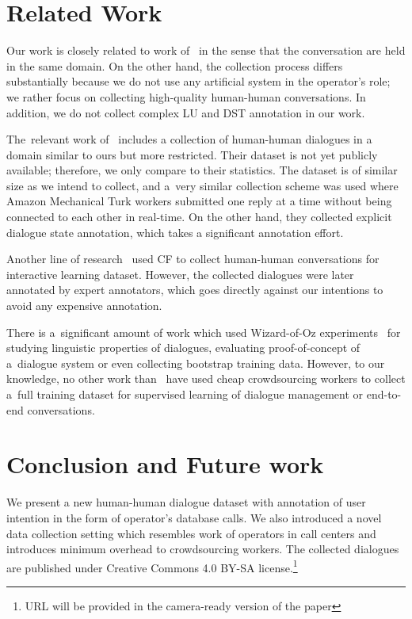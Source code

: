 \documentclass[runningheads,a4paper]{llncs}
\begin{document}
\section{Related Work} \label{sec:related}
\vspace{-0.50em}
Our work is closely related  to work of~\cite{williams2013dstc1,henderson2014dstc2,henderson2014dstc3} in the sense that the conversation are held in the same domain.
On the other hand, the collection process differs substantially because we do not use any artificial system in the operator's role;
we rather focus on collecting high-quality human-human conversations. 
In addition, we do not collect complex LU and DST annotation in our work.

The~relevant work of~\cite{wen2016network} includes a collection of human-human dialogues in a domain similar to ours but more restricted.
Their dataset is not yet publicly available; therefore, we only compare to their statistics.
The dataset is of similar size as we intend to collect, and a~very similar collection scheme was used where Amazon Mechanical Turk workers submitted one reply at a time without being connected to each other in real-time.
On the other hand, they collected explicit dialogue state annotation, which takes a significant annotation effort.

Another line of research~\cite{vodolan2016data} used CF to collect human-human conversations for interactive learning dataset.
However, the collected dialogues were later annotated by expert annotators, which goes directly against our intentions to avoid any expensive annotation.

There is a~significant amount of work which used Wizard-of-Oz experiments~\cite{whittaker2002fish,walker1997evaluating,rieser2008learning} for studying linguistic properties of dialogues, evaluating proof-of-concept of a~dialogue system or even collecting bootstrap training data.
However, to our knowledge, no other work than~\cite{wen2016network} have used cheap crowdsourcing workers to collect a~full training dataset for supervised learning of dialogue management or end-to-end conversations.

\section{Conclusion and Future work} \label{sec:conc}
\vspace{-0.50em}
We present a new human-human dialogue dataset with annotation of user intention in the form of operator's database calls.
We also introduced a novel data collection setting which resembles work of operators in call centers and introduces minimum overhead to crowdsourcing workers.
The collected dialogues are published under Creative Commons 4.0 BY-SA license.\footnote{URL will be provided in the camera-ready version of the paper}  %
\end{document}
